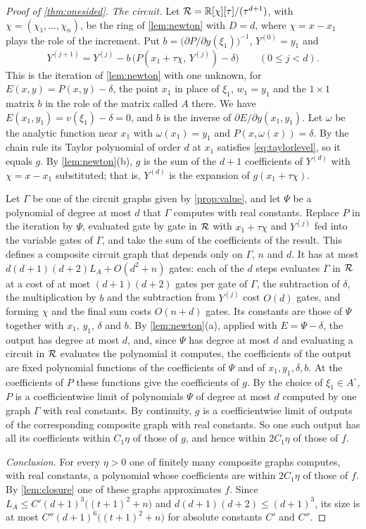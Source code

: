 \begin{proof}[Proof of \cref{thm:onesided}]
\emph{The circuit.} Let $\mathcal{R}=\mathbb{R}[\chi][\tau]/(\tau^{d+1})$, with $\chi=(\chi_1,\dots,\chi_n)$, be the ring of \cref{lem:newton} with $D=d$, where $\chi=x-x_1$ plays the role of the increment. Put $b=\bigl(\partial P/\partial y(\xi_1)\bigr)^{-1}$, $Y^{(0)}=y_1$ and
\[
Y^{(j+1)}=Y^{(j)}-b\,\bigl(P(x_1+\tau\chi,\,Y^{(j)})-\delta\bigr)\qquad(0\le j<d).
\]
This is the iteration of \cref{lem:newton} with one unknown, for $E(x,y)=P(x,y)-\delta$, the point $x_1$ in place of $\xi_1$, $w_1=y_1$ and the $1\times1$ matrix $b$ in the role of the matrix called $A$ there. We have $E(x_1,y_1)=v(\xi_1)-\delta=0$, and $b$ is the inverse of $\partial E/\partial y(x_1,y_1)$. Let $\omega$ be the analytic function near $x_1$ with $\omega(x_1)=y_1$ and $P(x,\omega(x))=\delta$. By the chain rule its Taylor polynomial of order $d$ at $x_1$ satisfies \eqref{eq:taylorlevel}, so it equals $g$. By \cref{lem:newton}(b), $g$ is the sum of the $d+1$ coefficients of $Y^{(d)}$ with $\chi=x-x_1$ substituted; that is, $Y^{(d)}$ is the expansion of $g(x_1+\tau\chi)$.

Let $\Gamma$ be one of the circuit graphs given by \cref{prop:value}, and let $\Psi$ be a polynomial of degree at most $d$ that $\Gamma$ computes with real constants. Replace $P$ in the iteration by $\Psi$, evaluated gate by gate in $\mathcal{R}$ with $x_1+\tau\chi$ and $Y^{(j)}$ fed into the variable gates of $\Gamma$, and take the sum of the coefficients of the result. This defines a composite circuit graph that depends only on $\Gamma$, $n$ and $d$. It has at most $d(d+1)(d+2)L_A+O(d^2+n)$ gates: each of the $d$ steps evaluates $\Gamma$ in $\mathcal{R}$ at a cost of at most $(d+1)(d+2)$ gates per gate of $\Gamma$, the subtraction of $\delta$, the multiplication by $b$ and the subtraction from $Y^{(j)}$ cost $O(d)$ gates, and forming $\chi$ and the final sum costs $O(n+d)$ gates. Its constants are those of $\Psi$ together with $x_1$, $y_1$, $\delta$ and $b$. By \cref{lem:newton}(a), applied with $E=\Psi-\delta$, the output has degree at most $d$, and, since $\Psi$ has degree at most $d$ and evaluating a circuit in $\mathcal{R}$ evaluates the polynomial it computes, the coefficients of the output are fixed polynomial functions of the coefficients of $\Psi$ and of $x_1,y_1,\delta,b$. At the coefficients of $P$ these functions give the coefficients of $g$. By the choice of $\xi_1\in A^\circ$, $P$ is a coefficientwise limit of polynomials $\Psi$ of degree at most $d$ computed by one graph $\Gamma$ with real constants. By continuity, $g$ is a coefficientwise limit of outputs of the corresponding composite graph with real constants. So one such output has all its coefficients within $C_1\eta$ of those of $g$, and hence within $2C_1\eta$ of those of $f$.

\emph{Conclusion.} For every $\eta>0$ one of finitely many composite graphs computes, with real constants, a polynomial whose coefficients are within $2C_1\eta$ of those of $f$. By \cref{lem:closure} one of these graphs approximates $f$. Since $L_A\le C'(d+1)^3\bigl((t+1)^2+n\bigr)$ and $d(d+1)(d+2)\le(d+1)^3$, its size is at most $C''(d+1)^6\bigl((t+1)^2+n\bigr)$ for absolute constants $C'$ and $C''$.
\end{proof}

